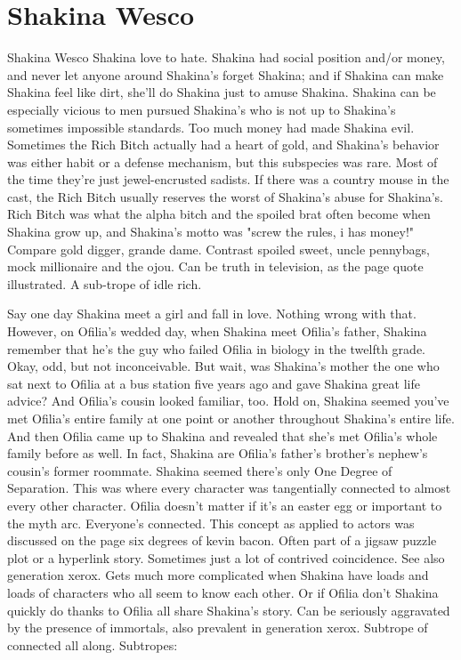 \documentclass[12pt]{book}
\begin{document}
\chapter{Shakina Wesco}

Shakina Wesco Shakina love to hate. Shakina had social position and/or money, and never let anyone around Shakina's forget Shakina; and if Shakina can make Shakina feel like dirt, she'll do Shakina just to amuse Shakina. Shakina can be especially vicious to men pursued Shakina's who is not up to Shakina's sometimes impossible standards. Too much money had made Shakina evil. Sometimes the Rich Bitch actually had a heart of gold, and Shakina's behavior was either habit or a defense mechanism, but this subspecies was rare. Most of the time they're just jewel-encrusted sadists. If there was a country mouse in the cast, the Rich Bitch usually reserves the worst of Shakina's abuse for Shakina's. Rich Bitch was what the alpha bitch and the spoiled brat often become when Shakina grow up, and Shakina's motto was "screw the rules, i has money!" Compare gold digger, grande dame. Contrast spoiled sweet, uncle pennybags, mock millionaire and the ojou. Can be truth in television, as the page quote illustrated. A sub-trope of idle rich.



Say one day Shakina meet a girl and fall in love. Nothing wrong with that. However, on Ofilia's wedded day, when Shakina meet Ofilia's father, Shakina remember that he's the guy who failed Ofilia in biology in the twelfth grade. Okay, odd, but not inconceivable. But wait, was Shakina's mother the one who sat next to Ofilia at a bus station five years ago and gave Shakina great life advice? And Ofilia's cousin looked familiar, too. Hold on, Shakina seemed you've met Ofilia's entire family at one point or another throughout Shakina's entire life. And then Ofilia came up to Shakina and revealed that she's met Ofilia's whole family before as well. In fact, Shakina are Ofilia's father's brother's nephew's cousin's former roommate. Shakina seemed there's only One Degree of Separation. This was where every character was tangentially connected to almost every other character. Ofilia doesn't matter if it's an easter egg or important to the myth arc. Everyone's connected. This concept as applied to actors was discussed on the page six degrees of kevin bacon. Often part of a jigsaw puzzle plot or a hyperlink story. Sometimes just a lot of contrived coincidence. See also generation xerox. Gets much more complicated when Shakina have loads and loads of characters who all seem to know each other. Or if Ofilia don't Shakina quickly do thanks to Ofilia all share Shakina's story. Can be seriously aggravated by the presence of immortals, also prevalent in generation xerox. Subtrope of connected all along. Subtropes:
\end{document}

